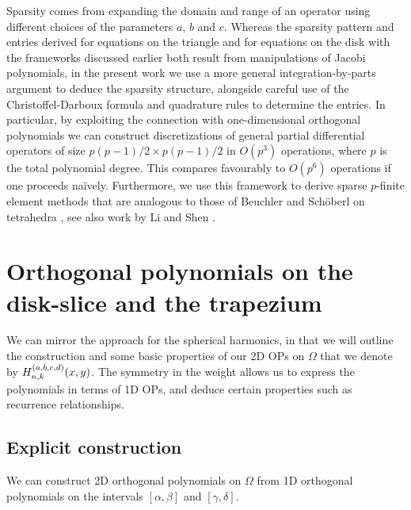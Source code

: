 Sparsity comes from expanding the domain and range of an operator using different choices of the parameters $a$, $b$ and $c$. Whereas the sparsity pattern and entries derived for equations on the triangle \cite{olver2018recurrence, olver2019triangle} and for equations on the disk \cite{vasil2016tensor} with the frameworks discussed earlier both result from manipulations of Jacobi polynomials, in the present work we use a more general integration-by-parts argument to deduce the sparsity structure, alongside careful use of the Christoffel-Darboux formula \cite[(18.2.12)]{DLMF} and quadrature rules to determine the entries. In particular, by exploiting the connection with one-dimensional orthogonal polynomials we can construct discretizations of general partial differential operators of size $p(p-1)/2 \times p(p-1)/2$ in $O(p^3)$ operations, where $p$ is the total polynomial degree. This compares favourably to $O(p^6)$ operations if one proceeds na\"ively. Furthermore, we use this framework to derive sparse $p$-finite element methods that are analogous to those of Beuchler and Sch\"oberl on tetrahedra \cite{beuchler2006new}, see also work by Li and Shen \cite{li2010optimal}.



\section{Orthogonal polynomials on the disk-slice and the trapezium}\label{Section:OPs}

We can mirror the approach for the spherical harmonics, in that we will outline the construction and some basic properties of our 2D OPs on $\Omega$ that we denote by $H_{n,k}^{(a,b,c,d)}(x,y)$. The symmetry in the weight allows us to express the polynomials in terms of 1D OPs, and deduce certain properties such as recurrence relationships. 

\subsection{Explicit construction}

We can construct 2D orthogonal polynomials on $\Omega$ from 1D orthogonal polynomials on the intervals $[\alpha,\beta]$ and $[\gamma,\delta]$. 

